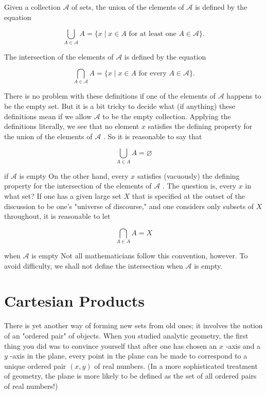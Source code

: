 \documentclass[10pt]{article}
\begin{document}
Given a collection \(\mathcal{A}\) of sets, the union of the elements of \(\mathcal{A}\) is defined by the equation

\[
\mathop{\bigcup }\limits_{{A \in  \mathcal{A}}}A = \{ x \mid  x \in  A\text{ for at least one }A \in  \mathcal{A}\} .
\]

The intersection of the elements of \(\mathcal{A}\) is defined by the equation

\[
\mathop{\bigcap }\limits_{{A \in  \mathcal{A}}}A = \{ x \mid  x \in  A\text{ for every }A \in  \mathcal{A}\} .
\]

There is no problem with these definitions if one of the elements of \(\mathcal{A}\) happens to be the empty set. But it is a bit tricky to decide what (if anything) these definitions mean if we allow \(\mathcal{A}\) to be the empty collection. Applying the definitions literally, we see that no element \(x\) satisfies the defining property for the union of the elements of \(\mathcal{A}\) . So it is reasonable to say that

\[
\mathop{\bigcup }\limits_{{A \in  A}}A = \varnothing
\]

if \(\mathcal{A}\) is empty On the other hand, every \(x\) satisfies (vacuously) the defining property for the intersection of the elements of \(\mathcal{A}\) . The question is, every \(x\) in what set? If one has a given large set \(X\) that is specified at the outset of the discussion to be one’s "universe of discourse," and one considers only subsets of \(X\) throughout, it is reasonable to let

\[
\mathop{\bigcap }\limits_{{A \in  A}}A = X
\]

when \(\mathcal{A}\) is empty Not all mathematicians follow this convention, however. To avoid difficulty, we shall not define the intersection when \(\mathcal{A}\) is empty.

\section*{Cartesian Products}

There is yet another way of forming new sets from old ones; it involves the notion of an "ordered pair" of objects. When you studied analytic geometry, the first thing you did was to convince yourself that after one has chosen an \(x\) -axis and a \(y\) -axis in the plane, every point in the plane can be made to correspond to a unique ordered pair \(\left( {x,y}\right)\) of real numbers. (In a more sophisticated treatment of geometry, the plane is more likely to be defined as the set of all ordered pairs of real numbers!)
\end{document}
